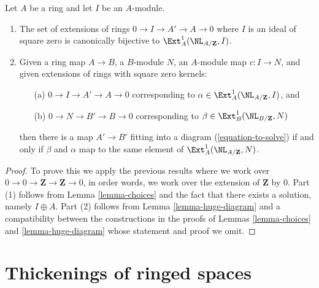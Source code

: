 \begin{lemma}
\label{lemma-extensions-of-rings}
Let $A$ be a ring and let $I$ be an $A$-module.
\begin{enumerate}
\item The set of extensions of rings $0 \to I \to A' \to A \to 0$
where $I$ is an ideal of square zero is canonically bijective to
$\Ext^1_A(\NL_{A/\mathbf{Z}}, I)$.
\item Given a ring map $A \to B$, a $B$-module $N$, an $A$-module
map $c : I \to N$, and given extensions of rings with square zero kernels:
\begin{enumerate}
\item[(a)] $0 \to I \to A' \to A \to 0$ corresponding to
$\alpha \in \Ext^1_A(\NL_{A/\mathbf{Z}}, I)$, and
\item[(b)] $0 \to N \to B' \to B \to 0$ corresponding to
$\beta \in \Ext^1_B(\NL_{B/\mathbf{Z}}, N)$
\end{enumerate}
then there is a map $A' \to B'$ fitting into a diagram
(\ref{equation-to-solve}) if and only if $\beta$ and $\alpha$
map to the same element of
$\Ext^1_A(\NL_{A/\mathbf{Z}}, N)$.
\end{enumerate}
\end{lemma}

\begin{proof}
To prove this we apply the previous results where we work over
$0 \to 0 \to \mathbf{Z} \to \mathbf{Z} \to 0$, in order words,
we work over the extension of $\mathbf{Z}$ by $0$.
Part (1) follows from Lemma \ref{lemma-choices}
and the fact that there exists a solution, namely $I \oplus A$.
Part (2) follows from Lemma \ref{lemma-huge-diagram}
and a compatibility between the constructions in the proofs
of Lemmas \ref{lemma-choices} and \ref{lemma-huge-diagram}
whose statement and proof we omit.
\end{proof}








\section{Thickenings of ringed spaces}
\label{section-thickenings-spaces}

